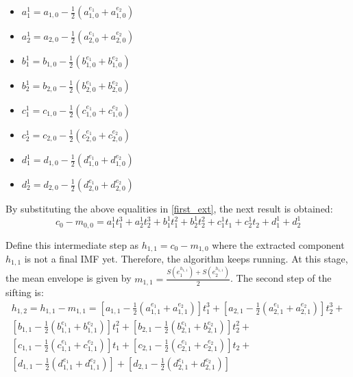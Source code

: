 \begin{multicols}{2}
\begin{itemize}
\item $a_1^1 = a_{1,0} - \frac{1}{2} \left( a_{1,0}^{e_1} + a_{1,0}^{e_2}  \right)$
\item $a_2^1 = a_{2,0} - \frac{1}{2} \left( a_{2,0}^{e_1} + a_{2,0}^{e_2} \right) $
\item $b_1^1 = b_{1,0} - \frac{1}{2} \left( b_{1,0}^{e_1} + b_{1,0}^{e_2}  \right)$
\item $b_2^1 = b_{2,0} - \frac{1}{2} \left( b_{2,0}^{e_1} + b_{2,0}^{e_2}  \right) $
\item $ c_1^1 = c_{1,0} - \frac{1}{2} \left( c_{1,0}^{e_1} + c_{1,0}^{e_2}  \right)$
\item $c_2^1 =  c_{2,0} - \frac{1}{2} \left( c_{2,0}^{e_1} + c_{2,0}^{e_2}  \right)  $
\item $d_1^1 = d_{1,0} - \frac{1}{2} \left( d_{1,0}^{e_1} + d_{1,0}^{e_2}  \right)$
\item $d_2^1 = d_{2,0} - \frac{1}{2} \left( d_{2,0}^{e_1} + d_{2,0}^{e_2}  \right)$
\end{itemize}
\end{multicols}

By substituting the above equalities in \ref{first_ext}, the next result is obtained:
\begin{equation}
c_0 - m_{0,0} = a_1^1 t_1^3 + a_2^1 t_2^3 + b_1^1 t_1^2 + b_2^1 t_2^2 + c_1^1 t_1 + c_2^1 t_2 + d_1^1 + d_2^1 
\end{equation}

Define this intermediate step as $h_{1,1} = c_0 - m_{1,0}$ where the extracted component $h_{1,1}$ is not a final IMF yet. Therefore, the algorithm keeps running. At this stage, the mean envelope is given by $m_{1,1} = \frac{S(e_1^{h_{1,1}})+S(e_2^{h_{1,1}})}{2}$. The second step of the sifting is:
\begin{equation}
\label{second_extr}
\begin{split}
h_{1,2} = h_{1,1} - m_{1,1} = \left[ a_{1,1} - \frac{1}{2} \left( a_{1,1}^{e_1} + a_{1,1}^{e_2}  \right) \right] t_1^3 + \left[ a_{2,1} - \frac{1}{2} \left( a_{2,1}^{e_1} + a_{2,1}^{e_2}  \right) \right] t_2^3 + \\
\left[ b_{1,1} - \frac{1}{2} \left( b_{1,1}^{e_1} + b_{1,1}^{e_2}  \right) \right] t_1^2 + \left[ b_{2,1} - \frac{1}{2} \left( b_{2,1}^{e_1} + b_{2,1}^{e_2}  \right) \right] t_2^2 + \\
\left[ c_{1,1} - \frac{1}{2} \left( c_{1,1}^{e_1} + c_{1,1}^{e_2}  \right) \right] t_1 + \left[ c_{2,1} - \frac{1}{2} \left( c_{2,1}^{e_1} + c_{2,1}^{e_2}  \right) \right] t_2 + \\
\left[ d_{1,1} - \frac{1}{2} \left( d_{1,1}^{e_1} + d_{1,1}^{e_2}  \right) \right] + \left[ d_{2,1} - \frac{1}{2} \left( d_{2,1}^{e_1} + d_{2,1}^{e_2}  \right) \right]
\end{split}
\end{equation}


